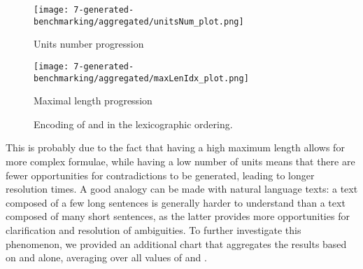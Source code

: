 \begin{figure}[H]
  \centering
  \begin{minipage}{0.8\textwidth}
    \centering
    \texttt{[image: 7-generated-benchmarking/aggregated/unitsNum\_plot.png]}
    \caption{Units number progression}\label{fig:unitsnum-progression}
  \end{minipage}
  \hfill
  \begin{minipage}{0.8\textwidth}
    \centering
    \texttt{[image: 7-generated-benchmarking/aggregated/maxLenIdx\_plot.png]}
    \caption{Maximal length progression}\label{fig:maxlen-progression}
  \end{minipage}
\end{figure}
\begin{figure}[H]
  \centering
  \caption{Encoding of  and  in the lexicographic ordering.}\label{fig:maxlen-unitsnum-encoding}
\end{figure}
This is probably due to the fact that having a high maximum length allows for more complex formulae, while having a low number of units means that there are fewer opportunities for contradictions to be generated, leading to longer resolution times.
A good analogy can be made with natural language texts: a text composed of a few long sentences is generally harder to understand than a text composed of many short sentences, as the latter provides more opportunities for clarification and resolution of ambiguities.
To further investigate this phenomenon, we provided an additional chart that aggregates the results based on  and  alone, averaging over all values of  and .

